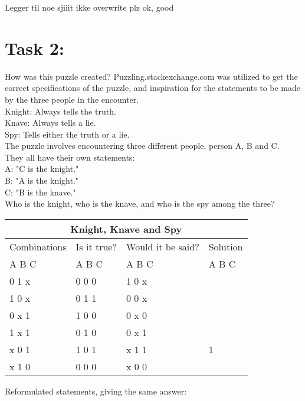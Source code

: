 \documentclass[11pt]{amsart}
\begin{document}
Legger til noe sjiiit
ikke overwrite plz ok, good


\section{Task 2:}

How was this puzzle created?
	Puzzling.stackexchange.com was utilized to get the correct specifications of the puzzle,
	and inspiration for the statements to be made by the three people in the encounter. \\

Knight: Always tells the truth.\\
Knave: 	Always tells a lie.\\
Spy: 		Tells either the truth or a lie. \\

The puzzle involves encountering three different people, person A, B and C. \\

They all have their own statements: \\

	A: "C is the knight."\\
	B: "A is the knight."\\
	C: "B is the knave." \\

Who is the knight, who is the knave, and who is the spy among the three? \\

\begin{tabular}{ |p{3cm}||p{3cm}|p{3cm}|p{3cm}|  }
 \hline
 \multicolumn{4}{|c|}{Knight, Knave and Spy} \\
 \hline
 Combinations & Is it true? & Would it be said? & Solution  \\ A  B  C   &   A  B  C  &   A  B  C & A  B  C \\
 \hline
	0   1   x  	& 0	0	0   & 1 0 x &  \\
	1   0   x		& 0	1	1  	& 0 0 x &  \\
	0   x   1 	&	1	0	0 	& 0 x 0 &  \\
	1   x   1  	&	0	1	0 	& 0 x 1 &  \\
	x   0   1		& 1	0	1  	& x 1 1 & 1\\
	x   1   0		& 0	0	0  	& x 0 0 &  \\

 \hline
\end{tabular}

Reformulated statements, giving the same answer:\\
\end{document}
